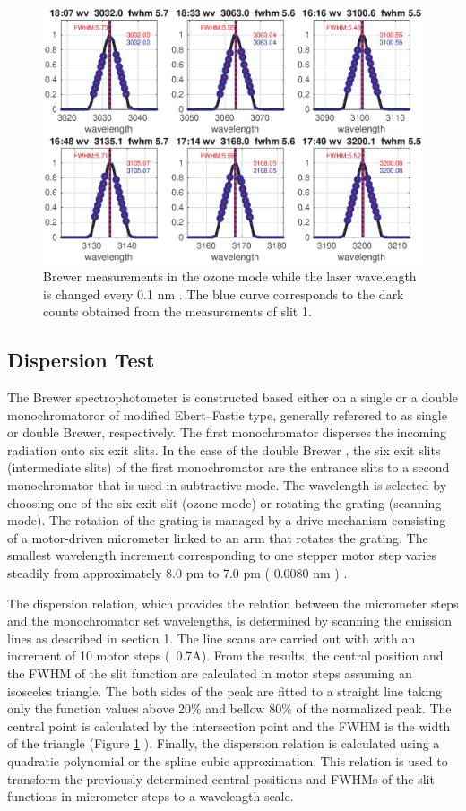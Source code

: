 \documentclass[acp, manuscript]{copernicus}
\begin{document}
\begin{figure}[t]
\includegraphics[width=12cm]{figures/General_Laser_scan_dsp.eps}
\caption{Brewer measurements in the ozone mode while the laser wavelength is changed every 0.1 nm . The blue curve corresponds to the dark counts obtained from the measurements of slit 1.}
\label{fig:laser_dsp}
\end{figure}
\subsection{Dispersion Test}

The Brewer spectrophotometer is constructed based either on a single or a double monochromatoror of modified Ebert–Fastie type, generally referered to as single or double Brewer, respectively. The first monochromator disperses the incoming radiation onto six exit slits. In the case of the double Brewer , the six exit slits  (intermediate slits) of the first monochromator are the entrance slits to a second monochromator that is used in subtractive mode. The wavelength is selected by choosing one of the six exit slit (ozone mode) or rotating the grating (scanning mode). The rotation of the grating is managed by a drive mechanism consisting of a motor-driven micrometer linked to an arm that rotates the grating. The smallest wavelength increment corresponding to one stepper motor step varies steadily from approximately 8.0 pm to 7.0 pm ( 0.0080 \unit{nm} ) \citet{Grobner1998}. 

The dispersion relation, which provides the  relation between the micrometer steps and the monochromator set wavelengths, is determined by scanning the emission lines as described in section 1. The line scans are carried out with with an increment of 10 motor steps (~0.7A). From the results, the central position and the FWHM of the slit function are calculated in  motor steps assuming an isosceles triangle. The both sides of the peak are  fitted to a straight line taking only the function values above 20\%  and bellow 80\% of the normalized peak. The central point is calculated by the intersection point and the FWHM is the width of the triangle (Figure \ref{fig:laser_dsp} ). Finally, the dispersion relation is calculated using a quadratic polynomial or the spline cubic approximation. This relation is used to transform the previously determined central positions and FWHMs of the slit functions in micrometer steps to a wavelength scale.
\end{document}

